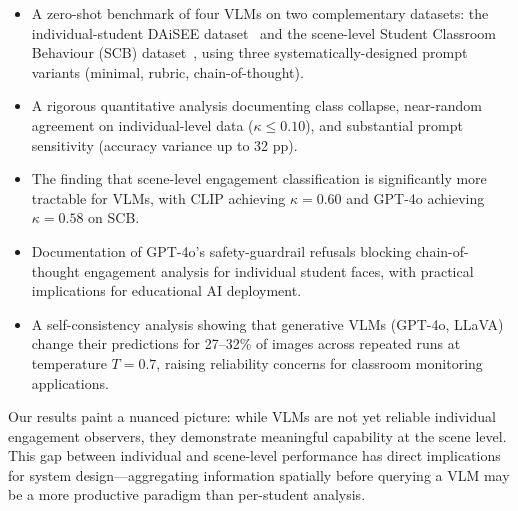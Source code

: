 \begin{itemize}
  \item A zero-shot benchmark of four VLMs on two complementary
    datasets: the individual-student DAiSEE dataset~\cite{gupta2016daisee}
    and the scene-level Student Classroom Behaviour (SCB)
    dataset~\cite{wang2023scb}, using three systematically-designed
    prompt variants (minimal, rubric, chain-of-thought).

  \item A rigorous quantitative analysis documenting class collapse,
    near-random agreement on individual-level data ($\kappa \leq 0.10$),
    and substantial prompt sensitivity (accuracy variance up to 32 pp).

  \item The finding that scene-level engagement classification is
    significantly more tractable for VLMs, with CLIP achieving
    $\kappa = 0.60$ and GPT-4o achieving $\kappa = 0.58$ on SCB.

  \item Documentation of GPT-4o's safety-guardrail refusals blocking
    chain-of-thought engagement analysis for individual student faces,
    with practical implications for educational AI deployment.

  \item A self-consistency analysis showing that generative VLMs
    (GPT-4o, LLaVA) change their predictions for 27--32\% of images
    across repeated runs at temperature $T\!=\!0.7$, raising reliability
    concerns for classroom monitoring applications.
\end{itemize}

Our results paint a nuanced picture: while VLMs are not yet reliable
individual engagement observers, they demonstrate meaningful capability
at the scene level.  This gap between individual and scene-level
performance has direct implications for system design---aggregating
information spatially before querying a VLM may be a more productive
paradigm than per-student analysis.
